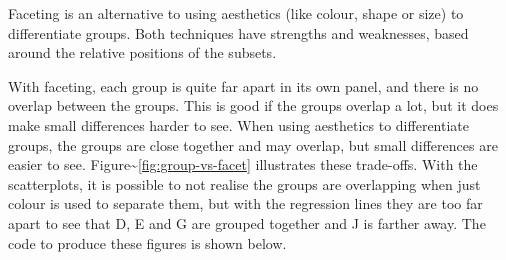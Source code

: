 Faceting is an alternative to using aesthetics (like colour, shape or
size) to differentiate groups. Both techniques have strengths and
weaknesses, based around the relative positions of the subsets.
 

With faceting, each group is quite far apart in its own panel, and there
is no overlap between the groups. This is good if the groups overlap a
lot, but it does make small differences harder to see. When using
aesthetics to differentiate groups, the groups are close together and
may overlap, but small differences are easier to see.
Figure\textasciitilde{}\ref{fig:group-vs-facet} illustrates these
trade-offs. With the scatterplots, it is possible to not realise the
groups are overlapping when just colour is used to separate them, but
with the regression lines they are too far apart to see that D, E and G
are grouped together and J is farther away. The code to produce these
figures is shown below.

\begin{Shaded}
\end{Shaded}

